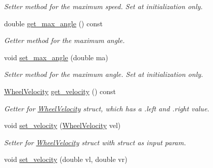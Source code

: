 \begin{DoxyCompactItemize}
\begin{DoxyCompactList}\small\item\em Setter method for the maximum speed. Set at initialization only. \end{DoxyCompactList}\item 
double \hyperlink{classMotionHandler_a55eb7aeb355b6ee86b2bd8751fde6cb5}{get\+\_\+max\+\_\+angle} () const \hypertarget{classMotionHandler_a55eb7aeb355b6ee86b2bd8751fde6cb5}{}\label{classMotionHandler_a55eb7aeb355b6ee86b2bd8751fde6cb5}

\begin{DoxyCompactList}\small\item\em Getter method for the maximum angle. \end{DoxyCompactList}\item 
void \hyperlink{classMotionHandler_aa73973c705626f1f95ac59391f23bcc9}{set\+\_\+max\+\_\+angle} (double ma)\hypertarget{classMotionHandler_aa73973c705626f1f95ac59391f23bcc9}{}\label{classMotionHandler_aa73973c705626f1f95ac59391f23bcc9}

\begin{DoxyCompactList}\small\item\em Setter method for the maximum angle. Set at initialization only. \end{DoxyCompactList}\item 
\hyperlink{structWheelVelocity}{Wheel\+Velocity} \hyperlink{classMotionHandler_a99fe1b248e817556de2b366a2d98c57c}{get\+\_\+velocity} () const \hypertarget{classMotionHandler_a99fe1b248e817556de2b366a2d98c57c}{}\label{classMotionHandler_a99fe1b248e817556de2b366a2d98c57c}

\begin{DoxyCompactList}\small\item\em Getter for \hyperlink{structWheelVelocity}{Wheel\+Velocity} struct, which has a .left and .right value. \end{DoxyCompactList}\item 
void \hyperlink{classMotionHandler_ac4bf67ba783c1afb5a5839229de3f3f9}{set\+\_\+velocity} (\hyperlink{structWheelVelocity}{Wheel\+Velocity} vel)\hypertarget{classMotionHandler_ac4bf67ba783c1afb5a5839229de3f3f9}{}\label{classMotionHandler_ac4bf67ba783c1afb5a5839229de3f3f9}

\begin{DoxyCompactList}\small\item\em Setter for \hyperlink{structWheelVelocity}{Wheel\+Velocity} struct with struct as input param. \end{DoxyCompactList}\item 
void \hyperlink{classMotionHandler_af31975aa667ca20835e4d5bb0216706e}{set\+\_\+velocity} (double vl, double vr)\hypertarget{classMotionHandler_af31975aa667ca20835e4d5bb0216706e}{}\label{classMotionHandler_af31975aa667ca20835e4d5bb0216706e}


\end{DoxyCompactItemize}
